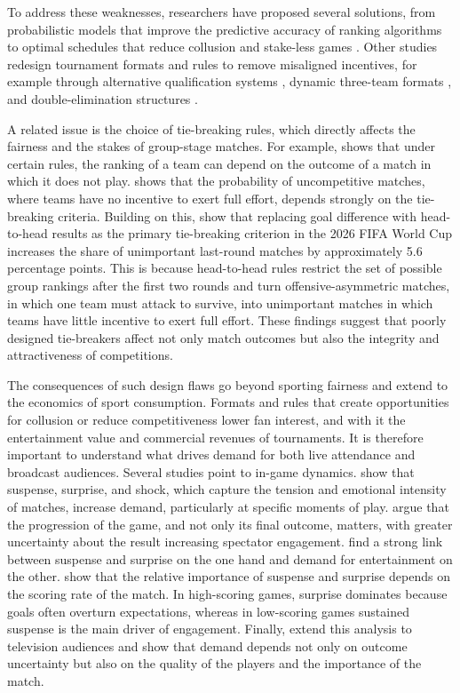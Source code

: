 \documentclass[11pt]{article}
\begin{document}
To address these weaknesses, researchers have proposed several solutions, from probabilistic models that improve the predictive accuracy of ranking algorithms \citep{szczecinski2022fifa} to optimal schedules that reduce collusion and stake-less games \citep{chater2021fixing}. Other studies redesign tournament formats and rules to remove misaligned incentives, for example through alternative qualification systems \citep{guajardo2024tournament}, dynamic three-team formats \citep{troyano2023new}, and double-elimination structures \citep{renno2023double}.

\vspace{0.5em}

A related issue is the choice of tie-breaking rules, which directly affects the fairness and the stakes of group-stage matches. For example, \citet{berker2014tie} shows that under certain rules, the ranking of a team can depend on the outcome of a match in which it does not play. \citet{csato2023avoid} shows that the probability of uncompetitive matches, where teams have no incentive to exert full effort, depends strongly on the tie-breaking criteria. Building on this, \citet{csato2026match} show that replacing goal difference with head-to-head results as the primary tie-breaking criterion in the 2026 FIFA World Cup increases the share of unimportant last-round matches by approximately 5.6 percentage points. This is because head-to-head rules restrict the set of possible group rankings after the first two rounds and turn offensive-asymmetric matches, in which one team must attack to survive, into unimportant matches in which teams have little incentive to exert full effort. These findings suggest that poorly designed tie-breakers affect not only match outcomes but also the integrity and attractiveness of competitions.

The consequences of such design flaws go beyond sporting fairness and extend to the economics of sport consumption. Formats and rules that create opportunities for collusion or reduce competitiveness lower fan interest, and with it the entertainment value and commercial revenues of tournaments. It is therefore important to understand what drives demand for both live attendance and broadcast audiences. Several studies point to in-game dynamics. \citet{buraimo2020unscripted} show that suspense, surprise, and shock, which capture the tension and emotional intensity of matches, increase demand, particularly at specific moments of play. \citet{alavy2010edge} argue that the progression of the game, and not only its final outcome, matters, with greater uncertainty about the result increasing spectator engagement. \citet{bizzozero2016importance} find a strong link between suspense and surprise on the one hand and demand for entertainment on the other. \citet{flepp2026suspense} show that the relative importance of suspense and surprise depends on the scoring rate of the match. In high-scoring games, surprise dominates because goals often overturn expectations, whereas in low-scoring games sustained suspense is the main driver of engagement. Finally, \citet{buraimo2022armchair} extend this analysis to television audiences and show that demand depends not only on outcome uncertainty but also on the quality of the players and the importance of the match.
\end{document}
